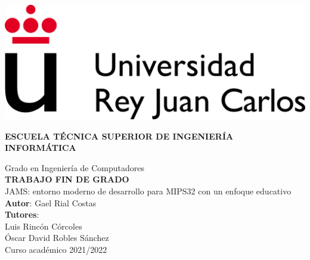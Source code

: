 \thispagestyle{empty}

\begin{center}
\includegraphics{images/URJC_logo}

\vspace{2cm}

	\large{\textbf{ESCUELA TÉCNICA SUPERIOR DE INGENIERÍA INFORMÁTICA}}
	\vspace{5mm}

 	{\Large {Grado en Ingeniería de Computadores}}
    \\
  	\vspace{34mm}
	{\large {\bf TRABAJO FIN DE GRADO}}
  	\vspace{10mm}
    \\
  	{\Large {{\Huge {
  		JAMS: entorno moderno de desarrollo para MIPS32 con un enfoque educativo
	}} \\[1cm] }}
  	\vspace{2cm}
	{\large {
        \textbf{Autor}: Gael Rial Costas\\
        \textbf{Tutores}:\\
        Luis Rincón Córcoles\\
        Óscar David Robles Sánchez\\
  	}}
	\vspace{10mm}
  	{\large {Curso académico 2021/2022}}
  	\vspace{1cm}
\end{center}
